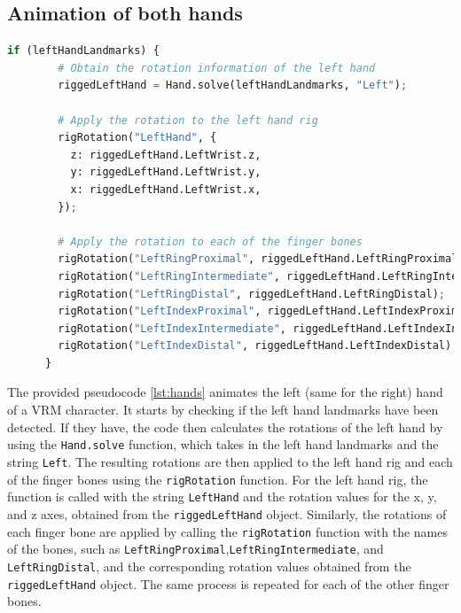 \subsection{Animation of both hands}
\begin{lstlisting}[language=Python,caption=Animating the left hand,label=lst:hands]
    if (leftHandLandmarks) {
        # Obtain the rotation information of the left hand
        riggedLeftHand = Hand.solve(leftHandLandmarks, "Left");
      
        # Apply the rotation to the left hand rig
        rigRotation("LeftHand", {
          z: riggedLeftHand.LeftWrist.z,
          y: riggedLeftHand.LeftWrist.y,
          x: riggedLeftHand.LeftWrist.x,
        });
      
        # Apply the rotation to each of the finger bones
        rigRotation("LeftRingProximal", riggedLeftHand.LeftRingProximal);
        rigRotation("LeftRingIntermediate", riggedLeftHand.LeftRingIntermediate);
        rigRotation("LeftRingDistal", riggedLeftHand.LeftRingDistal);
        rigRotation("LeftIndexProximal", riggedLeftHand.LeftIndexProximal);
        rigRotation("LeftIndexIntermediate", riggedLeftHand.LeftIndexIntermediate);
        rigRotation("LeftIndexDistal", riggedLeftHand.LeftIndexDistal);
      }
\end{lstlisting}
The provided pseudocode \ref{lst:hands} animates the left (same for the right) hand of a VRM character. 
It starts by checking if the left hand landmarks have been detected. 
If they have, the code then calculates the rotations of the left hand by 
using the \texttt{Hand.solve} function, which takes in the left hand landmarks and the string \texttt{Left}.
The resulting rotations are then applied to the left hand rig and each of the finger 
bones using the \texttt{rigRotation} function. For the left hand rig, the function is called with 
the string \texttt{LeftHand} and the rotation values for the x, y, and z axes, obtained from the 
\texttt{riggedLeftHand} object.
Similarly, the rotations of each finger bone are applied by calling the \texttt{rigRotation} function 
with the names of the bones, such as \texttt{LeftRingProximal},\texttt{LeftRingIntermediate}, and \texttt{LeftRingDistal}, 
and the corresponding rotation values obtained from the \texttt{riggedLeftHand} object. The same process is 
repeated for each of the other finger bones.